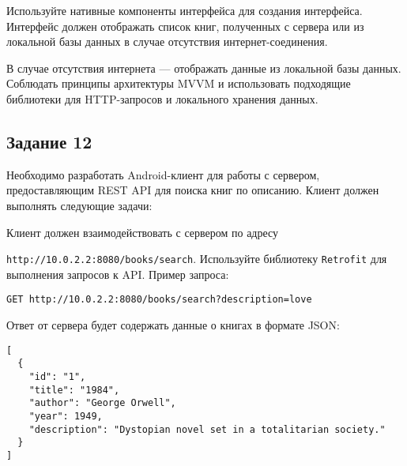 \documentclass[a4paper,12pt]{article}
\begin{document}

Используйте нативные компоненты интерфейса для создания интерфейса. Интерфейс должен отображать список книг, полученных с сервера или из локальной базы данных в случае отсутствия интернет-соединения.


В случае отсутствия интернета — отображать данные из локальной базы данных.
Соблюдать принципы архитектуры MVVM и использовать подходящие библиотеки для HTTP-запросов и локального хранения данных.

\subsection*{Задание 12}

Необходимо разработать Android-клиент для работы с сервером, предоставляющим REST API для поиска книг по описанию. Клиент должен выполнять следующие задачи:

Клиент должен взаимодействовать с сервером по адресу 

\texttt{http://10.0.2.2:8080/books/search}. Используйте библиотеку \texttt{Retrofit} для выполнения запросов к API. Пример запроса:

\begin{verbatim}
GET http://10.0.2.2:8080/books/search?description=love
\end{verbatim}

Ответ от сервера будет содержать данные о книгах в формате JSON:

\begin{verbatim}
[
  {
    "id": "1",
    "title": "1984",
    "author": "George Orwell",
    "year": 1949,
    "description": "Dystopian novel set in a totalitarian society."
  }
]
\end{verbatim}
\end{document}
